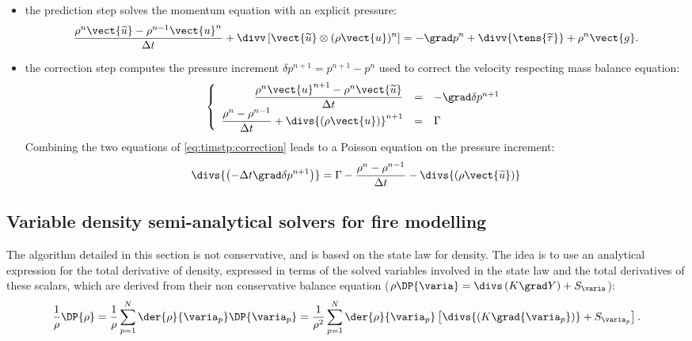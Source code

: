 \begin{itemize}
 \item the prediction step solves the momentum equation with an explicit pressure:
%
\begin{equation}\label{eq:timstp:prediction}
\dfrac{\rho^n \vect{\widetilde{u}} - \rho^{n-1} \vect{u}^n}{\Delta t}
+ \divv \left[\vect{\widetilde{u}} \otimes (\rho \vect{u})^n \right] = -\grad p^n + \divv{\tens{\widetilde{\tau}}} + \rho^n\vect{g}.
\end{equation}

 \item the correction step computes the pressure increment $\delta p^{n+1} = p^{n+1} - p^n$
 used to correct the velocity respecting mass balance equation:
\begin{equation}
\left\{
  \begin{array}{r c l}
\dfrac{\rho^n \vect{u}^{n+1} - \rho^n\vect{\widetilde{u}}}{\Delta t} & = & -\grad \delta p^{n+1}\\
\dfrac{\rho^n - \rho^{n-1}}{\Delta t}+\divs{ \left(\rho \vect{u} \right)}^{n+1} & = & \Gamma
  \end{array}
\right.
\label{eq:timstp:correction}
\end{equation}
Combining the two equations of \eqref{eq:timstp:correction} leads to a Poisson equation on the pressure increment:
\begin{equation}
\divs{ \left( -\Delta t \grad \delta p^{n+1} \right) } = \Gamma
- \dfrac{\rho^n - \rho^{n-1}}{\Delta t} - \divs{ \left( \rho \vect{\widetilde{u}} \right) }
\end{equation}

\end{itemize}


\subsection{Variable density semi-analytical solvers for fire modelling}
The algorithm detailed in this section is not conservative, and
is based on the state law for density.
The idea is to use an analytical expression for the total derivative of density,
expressed in terms of the solved variables
involved in the state law and the total derivatives of these scalars,
which are derived
from their non conservative balance equation ($\rho \DP{\varia} = \divs \left(K \grad Y \right)+ S_\varia $):
\begin{equation}
\dfrac{1}{\rho}\DP{\rho} = \dfrac{1}{\rho} \sum_{p=1}^N \der{\rho}{\varia_p}
\DP{\varia_p} = \dfrac{1}{\rho^2} \sum_{p=1}^N \der{\rho}{\varia_p} \left[\divs{ \left( K \grad {\varia_p} \right) }+S_{\varia_p}\right].
\label{eq:timstp:total_derivative}
\end{equation}

